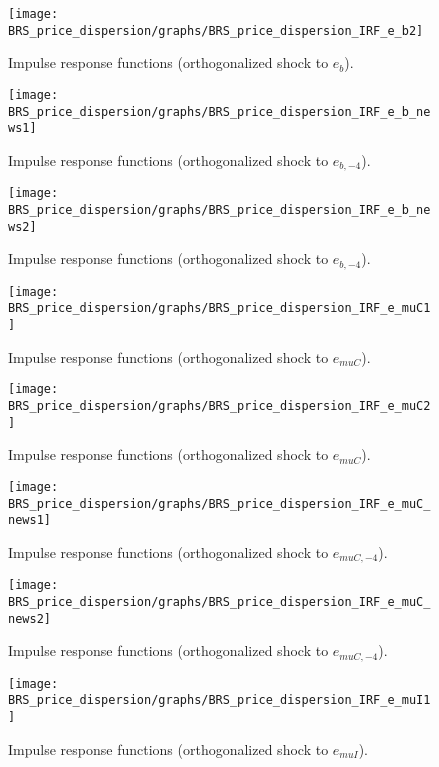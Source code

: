 \begin{figure}[H]
\centering 
\texttt{[image: BRS\_price\_dispersion/graphs/BRS\_price\_dispersion\_IRF\_e\_b2]}
\caption{Impulse response functions (orthogonalized shock to ${e_b}$).}\label{Fig:IRF:e_b:2}
\end{figure}
 
\begin{figure}[H]
\centering 
\texttt{[image: BRS\_price\_dispersion/graphs/BRS\_price\_dispersion\_IRF\_e\_b\_news1]}
\caption{Impulse response functions (orthogonalized shock to ${e_{b,-4}}$).}\label{Fig:IRF:e_b_news:1}
\end{figure}
 
\begin{figure}[H]
\centering 
\texttt{[image: BRS\_price\_dispersion/graphs/BRS\_price\_dispersion\_IRF\_e\_b\_news2]}
\caption{Impulse response functions (orthogonalized shock to ${e_{b,-4}}$).}\label{Fig:IRF:e_b_news:2}
\end{figure}
 
\begin{figure}[H]
\centering 
\texttt{[image: BRS\_price\_dispersion/graphs/BRS\_price\_dispersion\_IRF\_e\_muC1]}
\caption{Impulse response functions (orthogonalized shock to ${e_{muC}}$).}\label{Fig:IRF:e_muC:1}
\end{figure}
 
\begin{figure}[H]
\centering 
\texttt{[image: BRS\_price\_dispersion/graphs/BRS\_price\_dispersion\_IRF\_e\_muC2]}
\caption{Impulse response functions (orthogonalized shock to ${e_{muC}}$).}\label{Fig:IRF:e_muC:2}
\end{figure}
 
\begin{figure}[H]
\centering 
\texttt{[image: BRS\_price\_dispersion/graphs/BRS\_price\_dispersion\_IRF\_e\_muC\_news1]}
\caption{Impulse response functions (orthogonalized shock to ${e_{muC,-4}}$).}\label{Fig:IRF:e_muC_news:1}
\end{figure}
 
\begin{figure}[H]
\centering 
\texttt{[image: BRS\_price\_dispersion/graphs/BRS\_price\_dispersion\_IRF\_e\_muC\_news2]}
\caption{Impulse response functions (orthogonalized shock to ${e_{muC,-4}}$).}\label{Fig:IRF:e_muC_news:2}
\end{figure}
 
\begin{figure}[H]
\centering 
\texttt{[image: BRS\_price\_dispersion/graphs/BRS\_price\_dispersion\_IRF\_e\_muI1]}
\caption{Impulse response functions (orthogonalized shock to ${e_{muI}}$).}\label{Fig:IRF:e_muI:1}
\end{figure}
 
